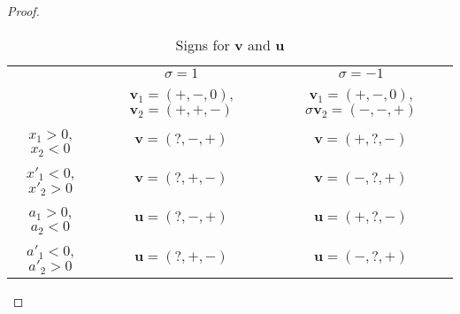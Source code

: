 \documentclass[11pt]{amsart}
\theoremstyle{remark}
\begin{document}
\begin{proof}
\begin{table}[h]
\begin{center}
\begin{tabular}{c|cc}
                  & $\sigma=1$   & $\sigma=-1$ \\
                  & $\mathbf v_1=(+,-,0)$, $\mathbf v_2=(+,+,-)$  & $\mathbf v_1=(+,-,0)$, $\sigma\mathbf v_2=(-,-,+)$ \\
\hline
$x_1>0$, $x_2<0$  & $\mathbf v=(?,-,+)$ & $\mathbf v=(+,?,-)$ \\
$x'_1<0$, $x'_2>0$  & $\mathbf v=(?,+,-)$ & $\mathbf v=(-,?,+)$ \\
$a_1>0$, $a_2<0$  & $\mathbf u=(?,-,+)$ & $\mathbf u=(+,?,-)$ \\
$a'_1<0$, $a'_2>0$  & $\mathbf u=(?,+,-)$ & $\mathbf u=(-,?,+)$ \\
\end{tabular}
\end{center}
\caption{Signs for $\mathbf v$ and $\mathbf u$}
\label{signs-vu}
\end{table}


\end{proof}
\end{document}
